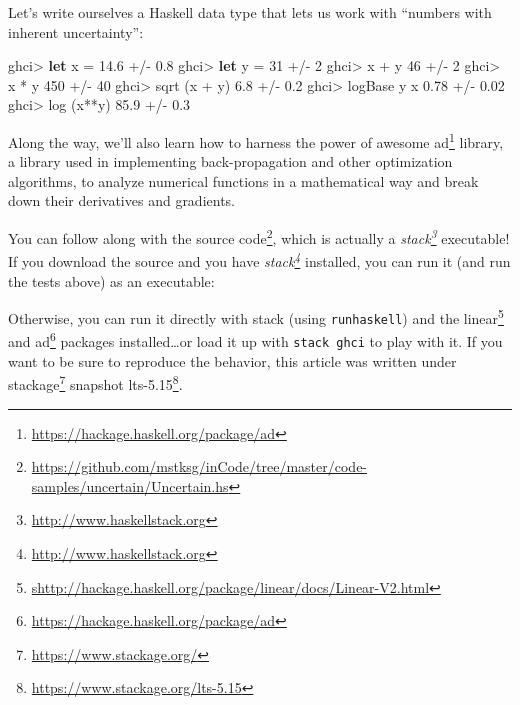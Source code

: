 \documentclass[]{article}
\newenvironment{Shaded}{}{}
\newcommand{\KeywordTok}[1]{\textcolor[rgb]{0.00,0.44,0.13}{\textbf{#1}}}
\newcommand{\DecValTok}[1]{\textcolor[rgb]{0.25,0.63,0.44}{#1}}
\newcommand{\FloatTok}[1]{\textcolor[rgb]{0.25,0.63,0.44}{#1}}
\newcommand{\FunctionTok}[1]{\textcolor[rgb]{0.02,0.16,0.49}{#1}}
\newcommand{\ExtensionTok}[1]{#1}
\newcommand{\NormalTok}[1]{#1}
\renewcommand{\href}[2]{#2\footnote{\url{#1}}}
\begin{document}
Let's write ourselves a Haskell data type that lets us work with ``numbers with
inherent uncertainty'':

\begin{Shaded}
\begin{Highlighting}[]
\NormalTok{ghci}\FunctionTok{>} \KeywordTok{let}\NormalTok{ x }\FunctionTok{=} \FloatTok{14.6} \FunctionTok{+/-} \FloatTok{0.8}
\NormalTok{ghci}\FunctionTok{>} \KeywordTok{let}\NormalTok{ y }\FunctionTok{=} \DecValTok{31}   \FunctionTok{+/-} \DecValTok{2}
\NormalTok{ghci}\FunctionTok{>}\NormalTok{ x }\FunctionTok{+}\NormalTok{ y}
\DecValTok{46} \FunctionTok{+/-} \DecValTok{2}
\NormalTok{ghci}\FunctionTok{>}\NormalTok{ x }\FunctionTok{*}\NormalTok{ y}
\DecValTok{450} \FunctionTok{+/-} \DecValTok{40}
\NormalTok{ghci}\FunctionTok{>}\NormalTok{ sqrt (x }\FunctionTok{+}\NormalTok{ y)}
\FloatTok{6.8} \FunctionTok{+/-} \FloatTok{0.2}
\NormalTok{ghci}\FunctionTok{>}\NormalTok{ logBase y x}
\FloatTok{0.78} \FunctionTok{+/-} \FloatTok{0.02}
\NormalTok{ghci}\FunctionTok{>}\NormalTok{ log (x}\FunctionTok{**}\NormalTok{y)}
\FloatTok{85.9} \FunctionTok{+/-} \FloatTok{0.3}
\end{Highlighting}
\end{Shaded}

Along the way, we'll also learn how to harness the power of awesome
\href{https://hackage.haskell.org/package/ad}{ad} library, a library used in
implementing back-propagation and other optimization algorithms, to analyze
numerical functions in a mathematical way and break down their derivatives and
gradients.

You can follow along with
\href{https://github.com/mstksg/inCode/tree/master/code-samples/uncertain/Uncertain.hs}{the
source code}, which is actually a
\emph{\href{http://www.haskellstack.org}{stack}} executable! If you download the
source and you have \emph{\href{http://www.haskellstack.org}{stack}} installed,
you can run it (and run the tests above) as an executable:

\begin{Shaded}
\end{Shaded}

Otherwise, you can run it directly with stack (using \texttt{runhaskell}) and
the
\href{shttp://hackage.haskell.org/package/linear/docs/Linear-V2.html}{linear}
and \href{https://hackage.haskell.org/package/ad}{ad} packages
installed\ldots{}or load it up with \texttt{stack\ ghci} to play with it. If you
want to be sure to reproduce the behavior, this article was written under
\href{https://www.stackage.org/}{stackage} snapshot
\href{https://www.stackage.org/lts-5.15}{lts-5.15}.
\end{document}
